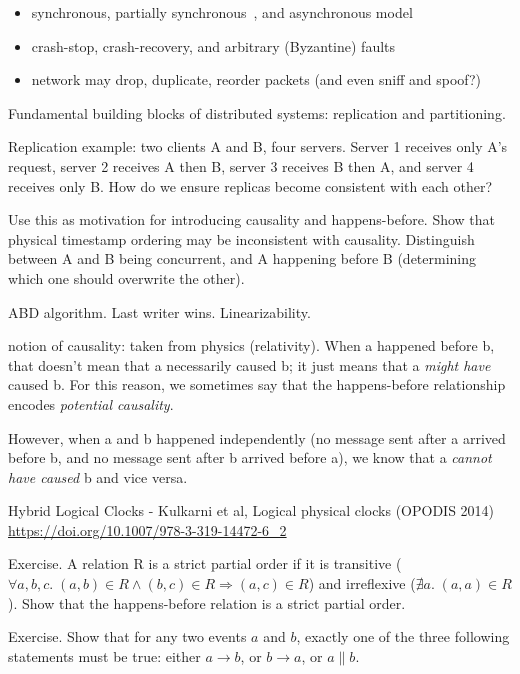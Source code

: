 \begin{itemize}
\item synchronous, partially synchronous~\cite{Dwork:1988dr}, and asynchronous model
\item crash-stop, crash-recovery, and arbitrary (Byzantine) faults
\item network may drop, duplicate, reorder packets (and even sniff and spoof?)
\end{itemize}

Fundamental building blocks of distributed systems: replication and partitioning.

Replication example: two clients A and B, four servers. Server 1 receives only A's request,
server 2 receives A then B, server 3 receives B then A, and server 4 receives only B.
How do we ensure replicas become consistent with each other?

Use this as motivation for introducing causality and happens-before.
Show that physical timestamp ordering may  be inconsistent with causality.
Distinguish between A and B being concurrent, and A happening before B
(determining which one should overwrite the other).

ABD algorithm. Last writer wins. Linearizability.

notion of causality: taken from physics (relativity).
When a happened before b, that doesn't mean that a necessarily caused b; it just means that a \emph{might have} caused b.
For this reason, we sometimes say that the happens-before relationship encodes \emph{potential causality}.

However, when a and b happened independently (no message sent after a arrived before b, and no message sent after b arrived before a), we know that a \emph{cannot have caused} b and vice versa.

Hybrid Logical Clocks - Kulkarni et al, Logical physical clocks (OPODIS 2014) \url{https://doi.org/10.1007/978-3-319-14472-6_2}

Exercise. A relation R is a strict partial order if it is transitive ($\forall a,b,c.\; (a,b) \in R \wedge (b,c) \in R \Longrightarrow (a,c) \in R$) and irreflexive ($\nexists a.\; (a,a) \in R$). Show that the happens-before relation is a strict partial order.

Exercise. Show that for any two events $a$ and $b$, exactly one of the three following statements must be true: either $a \rightarrow b$, or $b \rightarrow a$, or $a \parallel b$.




{}

